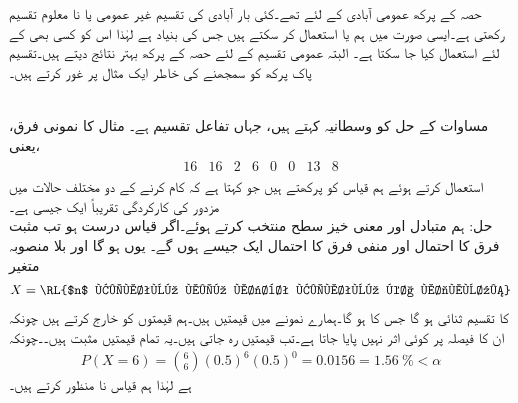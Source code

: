حصہ  کے پرکھ عمومی آبادی کے لئے تھے۔کئی بار آبادی کی تقسیم غیر عمومی یا نا معلوم تقسیم رکھتی ہے۔ایسی صورت  میں ہم  یا  استعمال کر سکتے ہیں جس کی بنیاد   ہے لہٰذا اس کو کسی بھی  کے لئے استعمال کیا جا سکتا ہے۔ البتہ عمومی تقسیم کے لئے حصہ 
 کے پرکھ بہتر نتائج دیتے ہیں۔تقسیم پاک پرکھ کو سمجھنے کی خاطر ایک مثال پر غور کرتے ہیں۔

\quad {}\\
مساوات  کے حل  کو وسطانیہ کہتے ہیں، جہاں  تفاعل تقسیم ہے۔ مثال  کا نمونی فرق، یعنی،
\begin{align*}
\begin{array}{cccccccc}
16&16&2&6&0&0&13&8
\end{array}
\end{align*}
استعمال کرتے ہوئے ہم قیاس  کو پرکھتے ہیں جو کہتا ہے کہ   کام کرنے کے دو مختلف حالات میں مزدور کی کارکردگی تقریباً ایک جیسی ہے۔\\
حل:\quad
ہم متبادل  اور معنی خیز سطح  منتخب کرتے ہوئے۔اگر قیاس درست ہو تب مثبت فرق کا احتمال  اور منفی فرق کا احتمال ایک جیسے ہوں گے۔ یوں  ہو گا اور بلا منصوبہ متغیر
\begin{align*}
X=\text{\RL{$n$ قیمتوں میں مثبت قیمتوں کا مجموعہ}}
\end{align*}
کا تقسیم ثنائی ہو گا جس کا  ہو گا۔ہمارے نمونے میں  قیمتیں ہیں۔ہم  قیمتوں کو خارج کرتے ہیں چونکہ ان کا فیصلہ پر کوئی اثر نہیں پایا جاتا ہے۔تب  قیمتیں رہ جاتی ہیں۔یہ تمام قیمتیں مثبت ہیں۔۔چونکہ
\begin{align*}
P(X=6)=\binom{6}{6} (0.5)^6(0.5)^0=0.0156=\SI{1.56}{\percent}<\alpha
\end{align*}
ہے لہٰذا ہم قیاس نا منظور کرتے ہیں۔

